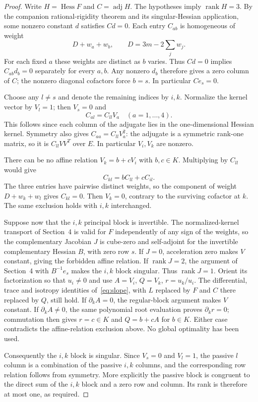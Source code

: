 \documentclass[11pt,a4paper]{article}
\newcommand{\Hess}{\operatorname{Hess}}
\newcommand{\rank}{\operatorname{rank}}
\newcommand{\adj}{\operatorname{adj}}
\begin{document}
\begin{proof}
Write $H=\Hess F$ and $C=\adj H$. The hypotheses imply $\rank H=3$. By the companion rational-rigidity theorem and its singular-Hessian application, some nonzero constant $d$ satisfies $Cd=0$. Each entry $C_{ab}$ is homogeneous of weight
\[
 D+w_a+w_b,\qquad D=3m-2\sum_j w_j.
\]
For each fixed $a$ these weights are distinct as $b$ varies. Thus $Cd=0$ implies $C_{ab}d_b=0$ separately for every $a,b$. Any nonzero $d_b$ therefore gives a zero column of $C$; the nonzero diagonal cofactors force $b=s$. In particular $Ce_s=0$.

Choose any $l\ne s$ and denote the remaining indices by $i,k$. Normalize the kernel vector by $V_l=1$; then $V_s=0$ and
\[
 C_{al}=C_{ll}V_a\quad(a=1,\ldots,4).
\]
This follows since each column of the adjugate lies in the one-dimensional Hessian kernel. Symmetry also gives $C_{aa}=C_{ll}V_a^2$: the adjugate is a symmetric rank-one matrix, so it is $C_{ll}VV^T$ over $E$. In particular $V_i,V_k$ are nonzero.

There can be no affine relation $V_k=b+cV_i$ with $b,c\in K$. Multiplying by $C_{ll}$ would give
\[
 C_{kl}=bC_{ll}+cC_{il}.
\]
The three entries have pairwise distinct weights, so the component of weight $D+w_k+w_l$ gives $C_{kl}=0$. Then $V_k=0$, contrary to the surviving cofactor at $k$. The same exclusion holds with $i,k$ interchanged.

Suppose now that the $i,k$ principal block is invertible. The normalized-kernel transport of Section~4 is valid for $F$ independently of any sign of the weights, so the complementary Jacobian $J$ is cube-zero and self-adjoint for the invertible complementary Hessian $B$, with zero row $s$.
If $J=0$, acceleration zero makes $V$ constant, giving the forbidden affine relation. If $\rank J=2$, the argument of Section~4 with $B^{-1}e_s$ makes the $i,k$ block singular. Thus $\rank J=1$. Orient its factorization so that $u_i\ne0$ and use $A=V_i$, $Q=V_k$, $r=u_k/u_i$. The differential, trace and isotropy identities of~\eqref{eq:slope}, with $L$ replaced by $F$ and $C$ there replaced by $Q$, still hold. If $\partial_k A=0$, the regular-block argument makes $V$ constant. If $\partial_k A\ne0$, the same polynomial root evaluation proves $\partial_k r=0$; commutation then gives $r=c\in K$ and $Q=b+cA$ for $b\in K$. Either case contradicts the affine-relation exclusion above. No global optimality has been used.

Consequently the $i,k$ block is singular. Since $V_s=0$ and $V_l=1$, the passive $l$ column is a combination of the passive $i,k$ columns, and the corresponding row relation follows from symmetry. More explicitly the passive block is congruent to the direct sum of the $i,k$ block and a zero row and column. Its rank is therefore at most one, as required.
\end{proof}
\end{document}
